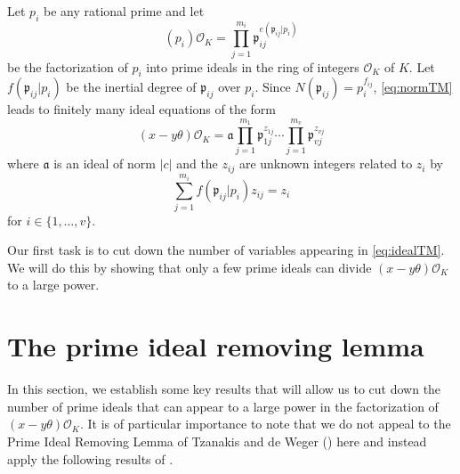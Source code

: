 Let $p_i$ be any rational prime and let 
\[(p_i)\mathcal{O}_K = \prod_{j = 1}^{m_i} \mathfrak{p}_{ij}^{e(\mathfrak{p}_{ij}|p_i)}\]
be the factorization of $p_i$ into prime ideals in the ring of integers $\mathcal{O}_K$ of $K$. Let $f(\mathfrak{p}_{ij}|p_i)$ be the inertial degree of $\mathfrak{p}_{ij}$ over $p_i$. Since $N(\mathfrak{p}_{ij}) = p_i^{f_{ij}}$, \eqref{eq:normTM} leads to finitely many ideal equations of the form
\begin{equation} \label{eq:idealTM}
(x-y\theta)\mathcal{O}_K = \mathfrak{a} \prod_{j = 1}^{m_1} \mathfrak{p}_{1j}^{z_{1j}} \cdots \prod_{j = 1}^{m_v} \mathfrak{p}_{vj}^{z_{vj}}
\end{equation}
where $\mathfrak{a}$ is an ideal of norm $|c|$ and the $z_{ij}$ are unknown integers related to $z_i$ by 
\[\sum_{j = 1}^{m_i} f(\mathfrak{p}_{ij}|p_i)z_{ij} = z_i\]
for $i \in \{1, \dots, v\}$.

Our first task is to cut down the number of variables appearing in \eqref{eq:idealTM}. We will do this by showing that only a few prime ideals can divide $(x-y\theta)\mathcal{O}_K$ to a large power. 


\section{The prime ideal removing lemma}
\label{sec:PIRL}

In this section, we establish some key results that will allow us to cut down the number of prime ideals that can appear to a large power in the factorization of $(x-y\theta)\mathcal{O}_K$. It is of particular importance to note that we do not appeal to the Prime Ideal Removing Lemma of Tzanakis and de Weger (\cite{TW3}) here and instead apply the following results of \cite{GhKaMaSi}. 

